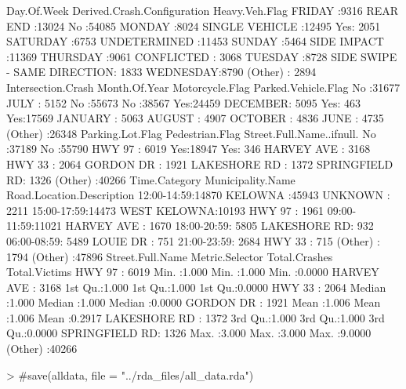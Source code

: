 \documentclass[11pt, a4paper]{article}
\begin{document}
\begin{Schunk}
\begin{Soutput}
    Day.Of.Week                Derived.Crash.Configuration Heavy.Veh.Flag
 FRIDAY   :9316   REAR END                   :13024        No :54085     
 MONDAY   :8024   SINGLE VEHICLE             :12495        Yes: 2051     
 SATURDAY :6753   UNDETERMINED               :11453                      
 SUNDAY   :5464   SIDE IMPACT                :11369                      
 THURSDAY :9061   CONFLICTED                 : 3068                      
 TUESDAY  :8728   SIDE SWIPE - SAME DIRECTION: 1833                      
 WEDNESDAY:8790   (Other)                    : 2894                      
 Intersection.Crash  Month.Of.Year   Motorcycle.Flag Parked.Vehicle.Flag
 No :31677          JULY    : 5152   No :55673       No :38567          
 Yes:24459          DECEMBER: 5095   Yes:  463       Yes:17569          
                    JANUARY : 5063                                      
                    AUGUST  : 4907                                      
                    OCTOBER : 4836                                      
                    JUNE    : 4735                                      
                    (Other) :26348                                      
 Parking.Lot.Flag Pedestrian.Flag  Street.Full.Name..ifnull.
 No :37189        No :55790       HWY 97        : 6019      
 Yes:18947        Yes:  346       HARVEY AVE    : 3168      
                                  HWY 33        : 2064      
                                  GORDON DR     : 1921      
                                  LAKESHORE RD  : 1372      
                                  SPRINGFIELD RD: 1326      
                                  (Other)       :40266      
     Time.Category      Municipality.Name Road.Location.Description
 12:00-14:59:14870   KELOWNA     :45943   UNKNOWN     : 2211       
 15:00-17:59:14473   WEST KELOWNA:10193   HWY 97      : 1961       
 09:00-11:59:11021                        HARVEY AVE  : 1670       
 18:00-20:59: 5805                        LAKESHORE RD:  932       
 06:00-08:59: 5489                        LOUIE DR    :  751       
 21:00-23:59: 2684                        HWY 33      :  715       
 (Other)    : 1794                        (Other)     :47896       
       Street.Full.Name Metric.Selector Total.Crashes   Total.Victims   
 HWY 97        : 6019   Min.   :1.000   Min.   :1.000   Min.   :0.0000  
 HARVEY AVE    : 3168   1st Qu.:1.000   1st Qu.:1.000   1st Qu.:0.0000  
 HWY 33        : 2064   Median :1.000   Median :1.000   Median :0.0000  
 GORDON DR     : 1921   Mean   :1.006   Mean   :1.006   Mean   :0.2917  
 LAKESHORE RD  : 1372   3rd Qu.:1.000   3rd Qu.:1.000   3rd Qu.:0.0000  
 SPRINGFIELD RD: 1326   Max.   :3.000   Max.   :3.000   Max.   :9.0000  
 (Other)       :40266                                                   
\end{Soutput}
\end{Schunk}




\begin{Schunk}
\begin{Sinput}
> #save(alldata, file = "../rda_files/all_data.rda")
\end{Sinput}
\end{Schunk}
\end{document}
